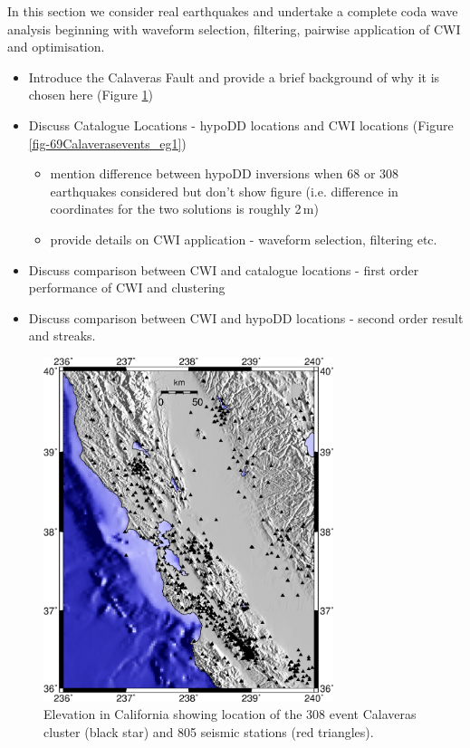\documentclass[extra]{gji}
\begin{document}
In this section we consider real
earthquakes and undertake a complete coda wave analysis beginning with waveform selection, filtering, pairwise application
of CWI and optimisation.
\begin{itemize}
\item Introduce the Calaveras Fault and provide a brief background of why it is chosen here (Figure \ref{fig:-eqopti-California-Calaveras})
\item Discuss Catalogue Locations - hypoDD locations and CWI locations
(Figure \ref{fig-69Calaverasevents_eg1})
\begin{itemize}
\item mention difference between hypoDD inversions when 68 or
308 earthquakes considered but don't show figure (i.e. difference in coordinates for
the two solutions is roughly 2\,m)
\item provide details on CWI application - waveform selection, filtering etc.
\end{itemize}
\item Discuss comparison between CWI and catalogue locations - first order performance of CWI and clustering
\item Discuss comparison between CWI and hypoDD locations - second order result and streaks.
\end{itemize}

\begin{figure}
\noindent\includegraphics[width = 20pc]{diags/CalaverasMap/gmt_california/CaliforniaCalaverasMap1.eps}
\caption{Elevation in California showing location
of the 308 event Calaveras cluster (black star) and 805 seismic stations (red triangles).}
\label{fig:-eqopti-California-Calaveras}
\end{figure}
\end{document}
